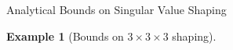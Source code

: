 \documentclass[journal]{IEEEtran}
\DeclareMathOperator{\sv}{sv}
\newtheorem{example}{Example}
\begin{document}
\begin{section}{Analytical Bounds on Singular Value Shaping}
\begin{example}[Bounds on $3 \times 3 \times 3$ shaping]
\begin{itemize}
			\end{itemize}





\end{example}
\end{section}
\end{document}
